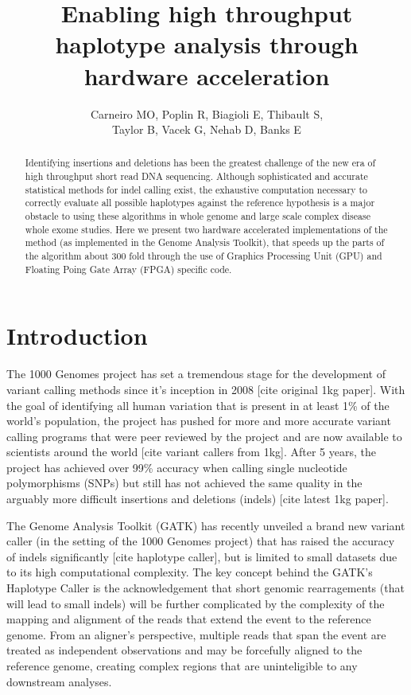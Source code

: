 \documentclass[11pt, oneside]{article}
\title{Enabling high throughput haplotype analysis through hardware acceleration}
\author{Carneiro MO, Poplin R, Biagioli E, Thibault S, \\  Taylor B, Vacek G, Nehab D, Banks E}
\begin{document}
 \maketitle
	
	\begin{abstract} 
	
	Identifying insertions and deletions has been the greatest challenge of the 
    new era of high throughput short read DNA sequencing. Although sophisticated
    and accurate statistical methods for indel calling exist, the exhaustive
    computation necessary to correctly evaluate all possible haplotypes against
    the reference hypothesis is a major obstacle to using these algorithms in
    whole genome and large scale complex disease whole exome studies.  Here we
    present two hardware accelerated implementations of the method (as
    implemented in the Genome Analysis Toolkit), that speeds up the parts of the
    algorithm about 300 fold through the use of Graphics Processing Unit (GPU) and
    Floating Poing Gate Array (FPGA) specific code.
    
	
	\end{abstract}

	\section{Introduction} 

    The 1000 Genomes project has set a tremendous stage for the development of
    variant calling methods since it's inception in 2008 [cite original 1kg
    paper]. With the goal of identifying all human variation that is present in
    at least 1\% of the world's population, the project has pushed for more and
    more accurate variant calling programs that were peer reviewed by the
    project and are now available to scientists around the world [cite variant
    callers from 1kg]. After 5 years, the project has achieved over 99\%
    accuracy when calling single nucleotide polymorphisms (SNPs) but still has
    not achieved the same quality in the arguably more difficult insertions and
    deletions (indels) [cite latest 1kg paper].
    
    The Genome Analysis Toolkit (GATK) has recently unveiled a brand new variant
    caller (in the setting of the 1000 Genomes project) that has raised the
    accuracy of indels significantly [cite haplotype caller], but is limited to
    small datasets due to its high computational complexity. The key concept
    behind the GATK's Haplotype Caller is the acknowledgement that short genomic
    rearragements (that will lead to small indels) will be further complicated
    by the complexity of the mapping and alignment of the reads that extend the
    event to the reference genome. From an aligner's perspective, multiple reads
    that span the event are treated as independent observations and may be
    forcefully aligned to the reference genome, creating complex regions that
    are uninteligible to any downstream analyses.
\end{document}
